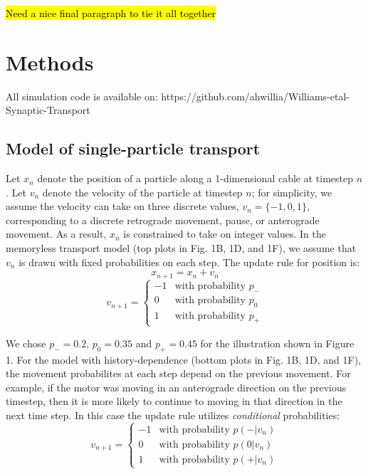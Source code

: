 \documentclass[11pt]{wlpeerj}
\begin{document}
\hl{Need a nice final paragraph to tie it all together}

\section*{Methods}

All simulation code is available on: https://github.com/ahwillia/Williams-etal-Synaptic-Transport

\subsection*{Model of single-particle transport}

Let $x_n$ denote the position of a particle along a 1-dimensional cable at timestep $n$. Let $v_n$ denote the velocity of the particle at timestep $n$; for simplicity, we assume the velocity can take on three discrete values, $v_n = \{-1,0,1\}$, corresponding to a discrete retrograde movement, pause, or anterograde movement. As a result, $x_n$ is constrained to take on integer values. In the memoryless transport model (top plots in Fig. 1B, 1D, and 1F), we assume that $v_n$ is drawn with fixed probabilities on each step. The update rule for position is:
$$x_{n+1} = x_n + v_n$$
$$v_{n+1} = \left\{\begin{matrix}
-1 & \text{with probability } p_-\\ 
0 & \text{with probability } p_0\\  
1 & \text{with probability } p_+
\end{matrix}\right.$$

We chose $p_- = 0.2$, $p_0 = 0.35$ and $p_+ = 0.45$ for the illustration shown in Figure 1. For the model with history-dependence (bottom plots in Fig. 1B, 1D, and 1F), the movement probabilites at each step depend on the previous movement. For example, if the motor was moving in an anterograde direction on the previous timestep, then it is more likely to continue to moving in that direction in the next time step. In this case the update rule utilizes \textit{conditional} probabilities:
$$v_{n+1} = \left\{\begin{matrix}
-1 & \text{with probability } p(-|v_n)\\ 
0 & \text{with probability } p(0|v_n)\\  
1 & \text{with probability } p(+|v_n)
\end{matrix}\right.$$
\end{document}
